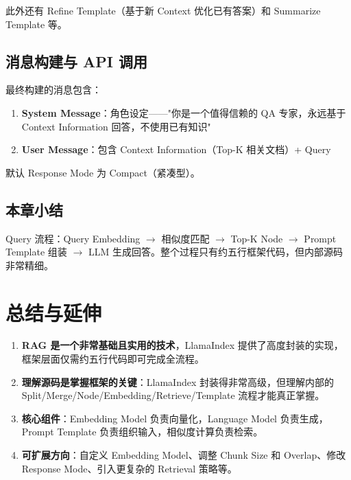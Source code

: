 \documentclass[a4paper]{article}
\begin{document}
此外还有 Refine Template（基于新 Context 优化已有答案）和 Summarize Template 等。

\subsection{消息构建与 API 调用}

最终构建的消息包含：
\begin{enumerate}
    \item \textbf{System Message}：角色设定——"你是一个值得信赖的 QA 专家，永远基于 Context Information 回答，不使用已有知识"
    \item \textbf{User Message}：包含 Context Information（Top-K 相关文档）+ Query
\end{enumerate}

默认 Response Mode 为 Compact（紧凑型）。

\subsection{本章小结}

Query 流程：Query Embedding $\rightarrow$ 相似度匹配 $\rightarrow$ Top-K Node $\rightarrow$ Prompt Template 组装 $\rightarrow$ LLM 生成回答。整个过程只有约五行框架代码，但内部源码非常精细。

\section{总结与延伸}

\begin{enumerate}
    \item \textbf{RAG 是一个非常基础且实用的技术}，LlamaIndex 提供了高度封装的实现，框架层面仅需约五行代码即可完成全流程。
    \item \textbf{理解源码是掌握框架的关键}：LlamaIndex 封装得非常高级，但理解内部的 Split/Merge/Node/Embedding/Retrieve/Template 流程才能真正掌握。
    \item \textbf{核心组件}：Embedding Model 负责向量化，Language Model 负责生成，Prompt Template 负责组织输入，相似度计算负责检索。
    \item \textbf{可扩展方向}：自定义 Embedding Model、调整 Chunk Size 和 Overlap、修改 Response Mode、引入更复杂的 Retrieval 策略等。
\end{enumerate}
\end{document}
